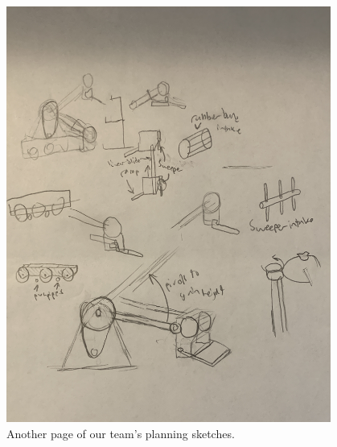 \begin{figure}[ht]
\begin{minipage}[b]{.48\textwidth}
  \includegraphics[width=0.95\textwidth]{Meetings/September/09-21-21/9-19-21_Team_Image4 - Nathan Forrer.JPG}
  \caption{Another page of our team's planning sketches.}
  \label{fig:pic4}
\end{minipage}
\end{figure}

